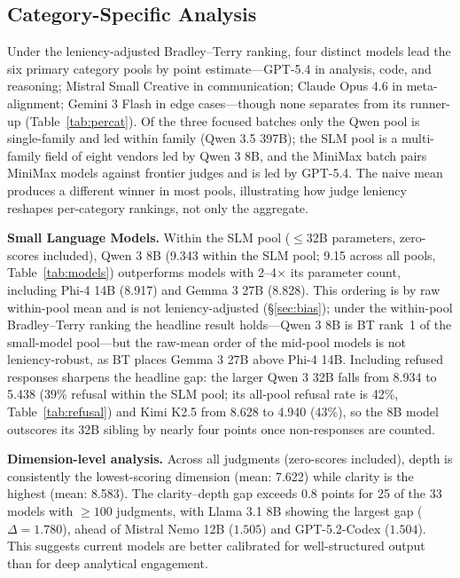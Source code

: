 \documentclass{article}
\begin{document}
\subsection{Category-Specific Analysis}
\label{sec:category}

Under the leniency-adjusted Bradley--Terry ranking, four distinct models lead the six primary category pools by point estimate---GPT-5.4 in analysis, code, and reasoning; Mistral Small Creative in communication; Claude Opus 4.6 in meta-alignment; Gemini 3 Flash in edge cases---though none separates from its runner-up (Table~\ref{tab:percat}). Of the three focused batches only the Qwen pool is single-family and led within family (Qwen 3.5 397B); the SLM pool is a multi-family field of eight vendors led by Qwen 3 8B, and the MiniMax batch pairs MiniMax models against frontier judges and is led by GPT-5.4. The naive mean produces a different winner in most pools, illustrating how judge leniency reshapes per-category rankings, not only the aggregate.

\textbf{Small Language Models.} Within the SLM pool ($\leq$32B parameters, zero-scores included), Qwen 3 8B (9.343 within the SLM pool; 9.15 across all pools, Table~\ref{tab:models}) outperforms models with 2--4$\times$ its parameter count, including Phi-4 14B (8.917) and Gemma 3 27B (8.828). This ordering is by raw within-pool mean and is not leniency-adjusted (\S\ref{sec:bias}); under the within-pool Bradley--Terry ranking the headline result holds---Qwen 3 8B is BT rank~1 of the small-model pool---but the raw-mean order of the mid-pool models is not leniency-robust, as BT places Gemma 3 27B above Phi-4 14B. Including refused responses sharpens the headline gap: the larger Qwen 3 32B falls from 8.934 to 5.438 (39\% refusal within the SLM pool; its all-pool refusal rate is 42\%, Table~\ref{tab:refusal}) and Kimi K2.5 from 8.628 to 4.940 (43\%), so the 8B model outscores its 32B sibling by nearly four points once non-responses are counted.

\textbf{Dimension-level analysis.} Across all judgments (zero-scores included), depth is consistently the lowest-scoring dimension (mean: 7.622) while clarity is the highest (mean: 8.583). The clarity--depth gap exceeds 0.8 points for 25 of the 33 models with $\geq 100$ judgments, with Llama 3.1 8B showing the largest gap ($\Delta = 1.780$), ahead of Mistral Nemo 12B ($1.505$) and GPT-5.2-Codex ($1.504$). This suggests current models are better calibrated for well-structured output than for deep analytical engagement.
\end{document}
